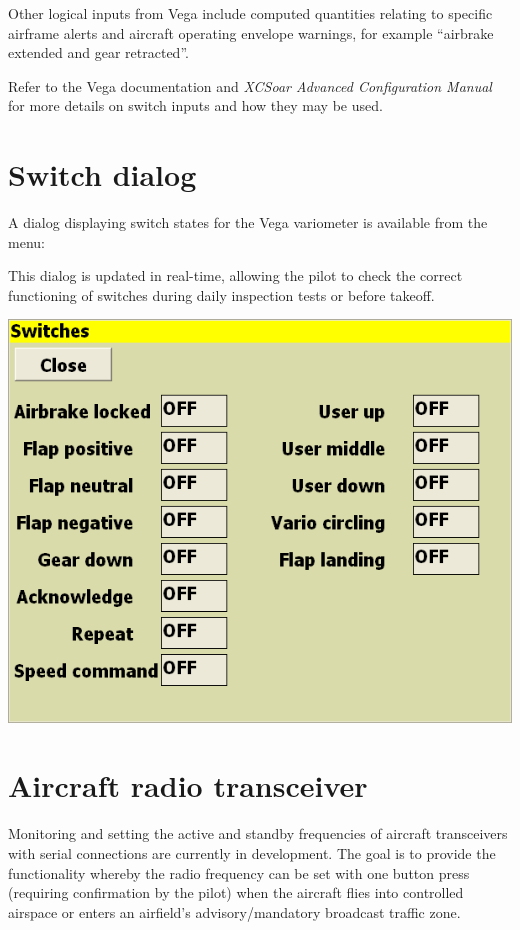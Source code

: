 \documentclass[a4paper,12pt]{refrep}
\begin{document}
Other logical inputs from Vega include computed quantities relating to
specific airframe alerts and aircraft operating envelope warnings, for
example ``airbrake extended and gear retracted''.  

Refer to the Vega documentation and {\em XCSoar Advanced Configuration
Manual} for more details on switch inputs and how they may be used.

\section{Switch dialog}

A dialog displaying switch states for the Vega variometer
is available from the menu:
\begin{quote}
\blink{}\blink{}\blink{}
\end{quote}

This dialog is updated in real-time, allowing the pilot
to check the correct functioning of switches during daily
inspection tests or before takeoff. 

\begin{center}
\includegraphics[angle=0,width=0.7\linewidth,keepaspectratio='true']{figures/dialog-switches.png}
\end{center}

\section{Aircraft radio transceiver}

Monitoring and setting the active and standby frequencies of aircraft
transceivers with serial connections are currently in development.
The goal is to provide the functionality whereby the radio frequency
can be set with one button press (requiring confirmation by the pilot)
when the aircraft flies into controlled airspace or enters an
airfield's advisory/mandatory broadcast traffic zone.
\end{document}
